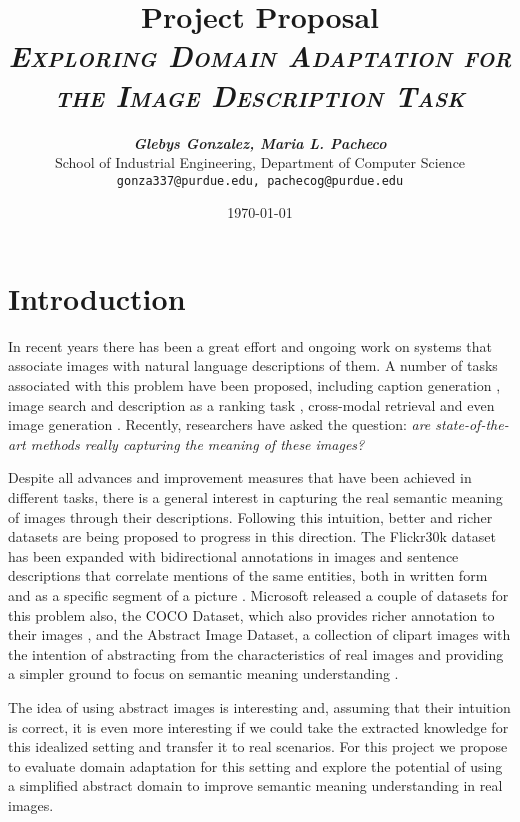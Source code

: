 \documentclass[11pt]{article}
\title{
\textbf{Project Proposal} \\ \textsc{\textit{Exploring Domain Adaptation for the Image Description Task}} \\
}
\author{
	\textbf{\textit{Glebys Gonzalez, Maria L. Pacheco}} \\
	School of Industrial Engineering, Department of Computer Science\\
	\texttt{gonza337@purdue.edu, pachecog@purdue.edu}
}
\date{\today}
\begin{document}
\maketitle


\section{Introduction}


In recent years there has been a great effort and ongoing work on systems that associate images with natural language descriptions of them. A number of tasks associated with this problem have been proposed, including caption generation \cite{DBLP:journals/corr/XuBKCCSZB15} \cite{Chen_2015_CVPR} \cite{DBLP:journals/corr/KarpathyF14}, image search and description as a ranking task \cite{Hodosh:2013:FID:2566972.2566993}, cross-modal retrieval \cite{rasiwasia2010new} \cite{josecp2014role} and even image generation \cite{6751319}. Recently, researchers have asked the question: \textit{are state-of-the-art methods really capturing the meaning of these images?}

Despite all advances and improvement measures that have been achieved in different tasks, there is a general interest in capturing the real semantic meaning of images through their descriptions. Following this intuition, better and richer datasets are being proposed to progress in this direction. The Flickr30k dataset has been expanded with bidirectional annotations in images and sentence descriptions that correlate mentions of the same entities, both in written form and as a specific segment of a picture \cite{DBLP:journals/corr/PlummerWCCHL15}. Microsoft released a couple of datasets for this problem also, the COCO Dataset, which also provides richer annotation to their images \cite{DBLP:journals/corr/LinMBHPRDZ14}, and the Abstract Image Dataset, a collection of clipart images with the intention of abstracting from the characteristics of real images and providing a simpler ground to focus on semantic meaning understanding \cite{Zitnick_2013_ICCV_Workshops}. 

The idea of using abstract images is interesting and, assuming that their intuition is correct, it is even more interesting if we could take the extracted knowledge for this idealized setting and transfer it to real scenarios. For this project we propose to evaluate domain adaptation for this setting and explore the potential of using a simplified abstract domain to improve semantic meaning understanding in real images.
\end{document}
